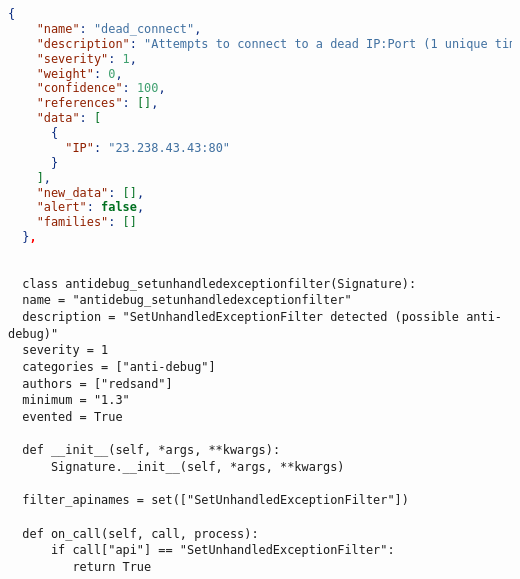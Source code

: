 \begin{lstlisting}[language=json, caption={Example of \emph{signature} part entries in \emph{report.json}},captionpos=b, label={lst:signature_example}]
  {
    "name": "dead_connect",
    "description": "Attempts to connect to a dead IP:Port (1 unique times)",
    "severity": 1,
    "weight": 0,
    "confidence": 100,
    "references": [],
    "data": [
      {
        "IP": "23.238.43.43:80"
      }
    ],
    "new_data": [],
    "alert": false,
    "families": []
  },
\end{lstlisting}


\begin{lstlisting}[language=mypython, caption={Example of signature implementation},captionpos=b, label={lst:signatureimpl}]
  
  class antidebug_setunhandledexceptionfilter(Signature):
  name = "antidebug_setunhandledexceptionfilter"
  description = "SetUnhandledExceptionFilter detected (possible anti-debug)"
  severity = 1
  categories = ["anti-debug"]
  authors = ["redsand"]
  minimum = "1.3"
  evented = True

  def __init__(self, *args, **kwargs):
      Signature.__init__(self, *args, **kwargs)

  filter_apinames = set(["SetUnhandledExceptionFilter"])

  def on_call(self, call, process):
      if call["api"] == "SetUnhandledExceptionFilter":
         return True
  
\end{lstlisting}


